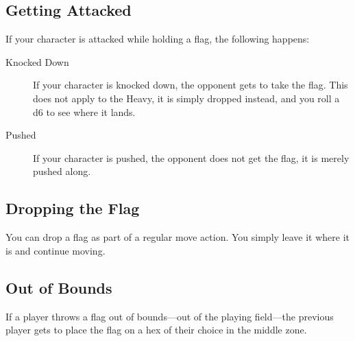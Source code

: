 \subsection{Getting Attacked}
If your character is attacked while holding a flag, the following happens:
\begin{description}
\item[Knocked Down] If your character is knocked down, the opponent gets to take the flag. This does not apply to the Heavy, it is simply dropped instead, and you roll a d6 to see where it lands.
\item[Pushed] If your character is pushed, the opponent does not get the flag, it is merely pushed along.
\end{description}

\subsection{Dropping the Flag}
You can drop a flag as part of a regular move action. You simply leave it where it is and continue moving.

\subsection{Out of Bounds}
If a player throws a flag out of bounds---out of the playing field---the previous player gets to place the flag on a hex of their choice in the middle zone.